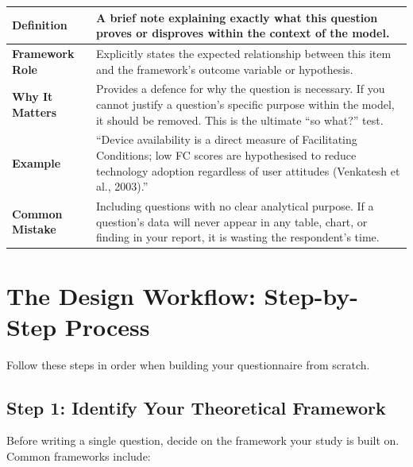 \documentclass[12pt,a4paper]{article}
\begin{document}
\begin{table}[H]\centering\small
\begin{tabularx}{\textwidth}{L{3cm} X}
\toprule
\textbf{Definition} & A brief note explaining exactly what this question proves or disproves within the context of the model. \\
\midrule
\textbf{Framework Role} & Explicitly states the expected relationship between this item and the framework's outcome variable or hypothesis. \\
\midrule
\textbf{Why It Matters} & Provides a defence for why the question is necessary. If you cannot justify a question's specific purpose within the model, it should be removed. This is the ultimate ``so what?'' test. \\
\midrule
\textbf{Example} & ``Device availability is a direct measure of Facilitating Conditions; low FC scores are hypothesised to reduce technology adoption regardless of user attitudes (Venkatesh et al., 2003).'' \\
\midrule
\textbf{Common Mistake} & Including questions with no clear analytical purpose. If a question's data will never appear in any table, chart, or finding in your report, it is wasting the respondent's time. \\
\bottomrule
\end{tabularx}
\end{table}

\newpage

\section{The Design Workflow: Step-by-Step Process}

Follow these steps in order when building your questionnaire from scratch.

\subsection{Step 1: Identify Your Theoretical Framework}

Before writing a single question, decide on the framework your study is built on. Common frameworks include:
\end{document}
